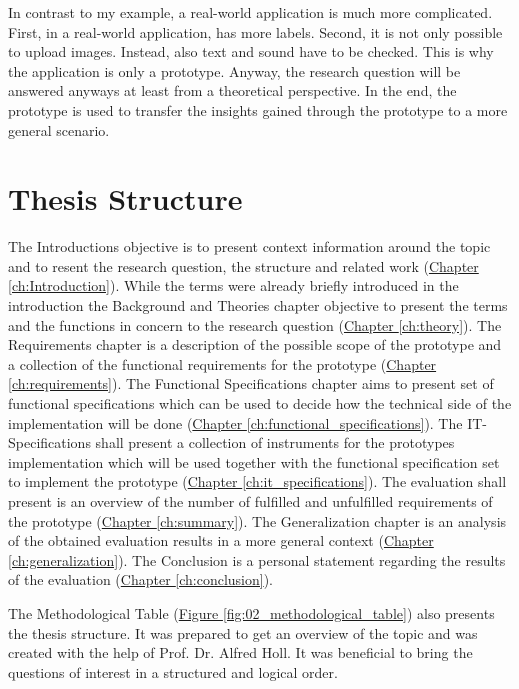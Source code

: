 In contrast to my example, a real-world application is much more complicated. First, in a real-world application, has more labels. Second, it is not only possible to upload images. Instead, also text and sound have to be checked. This is why the application is only a prototype. Anyway, the research question will be answered anyways at least from a theoretical perspective. In the end, the prototype is used to transfer the insights gained through the prototype to a more general scenario.

\section{Thesis Structure}
\label{sec:structure}

The Introductions objective is to present context information around the topic and to resent the research question, the structure and related work (\hyperref[ch:Introduction]{Chapter \ref{ch:Introduction}}). While the terms were already briefly introduced in the introduction the Background and Theories chapter objective to present the terms and the functions in concern to the research question  (\hyperref[ch:theory]{Chapter \ref{ch:theory}}). The Requirements chapter is a description of the possible scope of the prototype and a collection of the functional requirements for the prototype (\hyperref[ch:requirements]{Chapter \ref{ch:requirements}}). The Functional Specifications chapter aims to present set of functional specifications which can be used to decide how the technical side of the implementation will be done (\hyperref[ch:functional_specifications]{Chapter \ref{ch:functional_specifications}}). The IT-Specifications shall present a collection of instruments for the prototypes implementation which will be used together with the functional specification set to implement the prototype (\hyperref[ch:it_specifications]{Chapter \ref{ch:it_specifications}}). The evaluation shall present is an overview of the number of fulfilled and unfulfilled requirements of the prototype (\hyperref[ch:summary]{Chapter \ref{ch:summary}}). The Generalization chapter is an analysis of the obtained evaluation results in a more general context  (\hyperref[ch:generalization]{Chapter \ref{ch:generalization}}). The Conclusion is a personal statement regarding the results of the evaluation (\hyperref[ch:conclusion]{Chapter \ref{ch:conclusion}}).

The Methodological Table (\hyperref[fig:02_methodological_table]{Figure \ref{fig:02_methodological_table}})  also presents the thesis structure. It was prepared to get an overview of the topic and was created with the help of Prof. Dr. Alfred Holl. It was beneficial to bring the questions of interest in a structured and logical order. 

